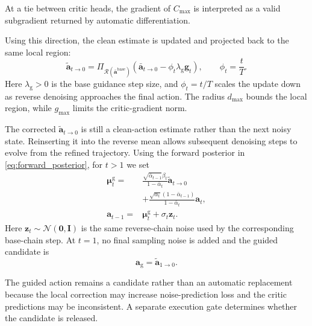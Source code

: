 \documentclass[9pt,journal]{IEEEtran}
\newcommand{\va}{\bm{a}}
\newcommand{\vag}{\ensuremath{\va_{\mathrm g}}}      %
\begin{document}
At a tie between critic heads, the gradient of $C_{\max}$ is interpreted
as a valid subgradient returned by automatic differentiation.

Using this direction, the clean estimate is updated and projected back
to the same local region:
\begin{equation}
    \tilde{\va}_{t\rightarrow0}
    =
    \Pi_{\mathcal R(\bar{\va}^{\mathrm{base}})}
    \left(
    \bar{\va}_{t\rightarrow0}
    -
    \phi_t\lambda_{\mathrm g}\bm g_t
    \right),
    \qquad
    \phi_t=\frac{t}{T}.
    \label{eq:guided_estimate}
\end{equation}
Here $\lambda_{\mathrm g}>0$ is the base guidance step
size, and $\phi_t=t/T$ scales the update down as reverse
denoising approaches the final action. The radius
$d_{\max}$ bounds the local region, while $g_{\max}$
limits the critic-gradient norm.


The corrected $\tilde{\va}_{t\rightarrow0}$ is still a clean-action
estimate rather than the next noisy state. Reinserting it into the
reverse mean allows subsequent denoising steps to evolve from the
refined trajectory. Using the forward posterior in
\eqref{eq:forward_posterior}, for $t>1$ we set
\begin{equation}
    \begin{aligned}
        \bm\mu_t^{\mathrm g}
        ={}&
        \frac{\sqrt{\bar\alpha_{t-1}}\beta_t}
        {1-\bar\alpha_t}
        \tilde{\va}_{t\rightarrow0}
        \\
        &+
        \frac{\sqrt{\alpha_t}(1-\bar\alpha_{t-1})}
        {1-\bar\alpha_t}
        \va_t,
        \\
        \va_{t-1}
        ={}&
        \bm\mu_t^{\mathrm g}
        +
        \sigma_t\bm z_t .
    \end{aligned}
    \label{eq:guided_reverse}
\end{equation}
Here $\bm z_t\sim\mathcal N(\bm0,\bm I)$ is the same reverse-chain noise
used by the corresponding base-chain step. At $t=1$, no final sampling
noise is added and the guided candidate is
\begin{equation*}
    \vag
    =
    \tilde{\va}_{1\rightarrow0}.
\end{equation*}

The guided action remains a candidate rather than an
automatic replacement because the local correction may
increase noise-prediction loss and the critic predictions
may be inconsistent. A separate execution gate determines
whether the candidate is released.
\end{document}
